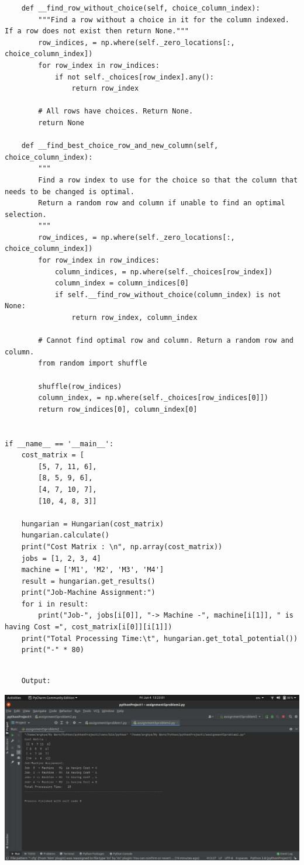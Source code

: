 \documentclass[12pt, letterpaper, twoside]{book}
\begin{document}
\begin{lstlisting}
    def __find_row_without_choice(self, choice_column_index):
        """Find a row without a choice in it for the column indexed. If a row does not exist then return None."""
        row_indices, = np.where(self._zero_locations[:, choice_column_index])
        for row_index in row_indices:
            if not self._choices[row_index].any():
                return row_index

        # All rows have choices. Return None.
        return None

    def __find_best_choice_row_and_new_column(self, choice_column_index):
        """
        Find a row index to use for the choice so that the column that needs to be changed is optimal.
        Return a random row and column if unable to find an optimal selection.
        """
        row_indices, = np.where(self._zero_locations[:, choice_column_index])
        for row_index in row_indices:
            column_indices, = np.where(self._choices[row_index])
            column_index = column_indices[0]
            if self.__find_row_without_choice(column_index) is not None:
                return row_index, column_index

        # Cannot find optimal row and column. Return a random row and column.
        from random import shuffle

        shuffle(row_indices)
        column_index, = np.where(self._choices[row_indices[0]])
        return row_indices[0], column_index[0]


if __name__ == '__main__':
    cost_matrix = [
        [5, 7, 11, 6],
        [8, 5, 9, 6],
        [4, 7, 10, 7],
        [10, 4, 8, 3]]

    hungarian = Hungarian(cost_matrix)
    hungarian.calculate()
    print("Cost Matrix : \n", np.array(cost_matrix))
    jobs = [1, 2, 3, 4]
    machine = ['M1', 'M2', 'M3', 'M4']
    result = hungarian.get_results()
    print("Job-Machine Assignment:")
    for i in result:
        print("Job-", jobs[i[0]], "-> Machine -", machine[i[1]], " is having Cost =", cost_matrix[i[0]][i[1]])
    print("Total Processing Time:\t", hungarian.get_total_potential())
    print("-" * 80)

\end{lstlisting}
\pagebreak
\begin{lstlisting}

	Output:

\end{lstlisting}

\includegraphics[width=550pt]{Output2}
\end{document}
